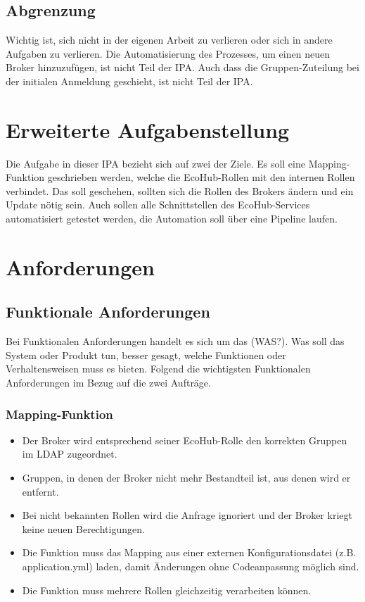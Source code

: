 \subsection{ Abgrenzung}
\label{sec:abgrenzung}
Wichtig ist, sich nicht in der eigenen Arbeit zu verlieren oder sich in andere Aufgaben zu verlieren. Die Automatisierung des Prozesses, um einen neuen Broker hinzuzufügen, ist nicht Teil der IPA.
Auch dass die Gruppen-Zuteilung bei der initialen Anmeldung geschieht, ist nicht Teil der IPA.

\section{Erweiterte Aufgabenstellung}
Die Aufgabe in dieser IPA bezieht sich auf zwei der Ziele. Es soll eine Mapping-Funktion geschrieben werden, welche die EcoHub-Rollen mit den internen Rollen verbindet. Das soll geschehen, sollten sich die Rollen des Brokers ändern und ein Update nötig sein.
Auch sollen alle Schnittstellen des EcoHub-Services automatisiert getestet werden, die Automation soll über eine Pipeline laufen.


\section{Anforderungen}
\subsection{Funktionale Anforderungen}
Bei Funktionalen Anforderungen handelt es sich um das (WAS?). Was soll das System oder Produkt tun, besser gesagt, welche Funktionen oder Verhaltensweisen muss es bieten. Folgend die wichtigsten Funktionalen Anforderungen im Bezug auf die zwei Aufträge.
\subsubsection{Mapping-Funktion}
\begin{itemize}
    \item Der Broker wird entsprechend seiner EcoHub-Rolle den korrekten Gruppen im LDAP zugeordnet.
    \item Gruppen, in denen der Broker nicht mehr Bestandteil ist, aus denen wird er entfernt.
    \item Bei nicht bekannten Rollen wird die Anfrage ignoriert und der Broker kriegt keine neuen Berechtigungen.
    \item Die Funktion muss das Mapping aus einer externen Konfigurationsdatei (z.B. application.yml) laden, damit Änderungen ohne Codeanpassung möglich sind.
    \item Die Funktion muss mehrere Rollen gleichzeitig verarbeiten können.
\end{itemize}
